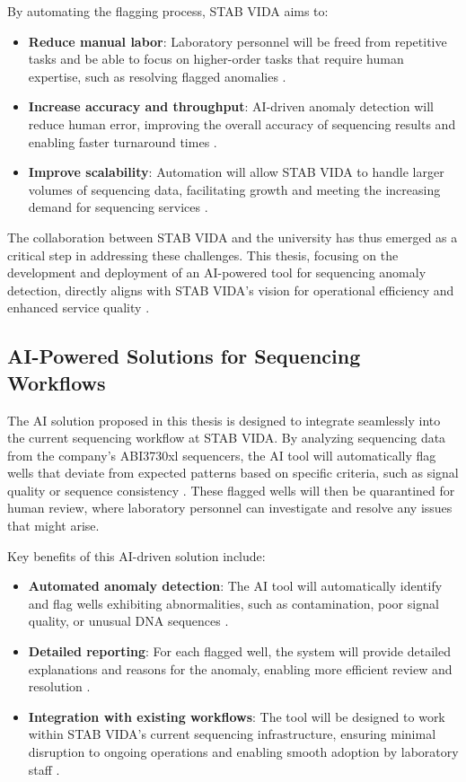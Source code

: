 By automating the flagging process, STAB VIDA aims to:

\begin{itemize} \item \textbf{Reduce manual labor}: Laboratory personnel will be freed from repetitive tasks and be able to focus on higher-order tasks that require human expertise, such as resolving flagged anomalies \cite{Yang2020}. \item \textbf{Increase accuracy and throughput}: AI-driven anomaly detection will reduce human error, improving the overall accuracy of sequencing results and enabling faster turnaround times \cite{Chen2019}. \item \textbf{Improve scalability}: Automation will allow STAB VIDA to handle larger volumes of sequencing data, facilitating growth and meeting the increasing demand for sequencing services \cite{Rajendran2021}. \end{itemize}

The collaboration between STAB VIDA and the university has thus emerged as a critical step in addressing these challenges. This thesis, focusing on the development and deployment of an AI-powered tool for sequencing anomaly detection, directly aligns with STAB VIDA’s vision for operational efficiency and enhanced service quality \cite{Sheng2018}.

\subsection{AI-Powered Solutions for Sequencing Workflows}

The AI solution proposed in this thesis is designed to integrate seamlessly into the current sequencing workflow at STAB VIDA. By analyzing sequencing data from the company's ABI3730xl sequencers, the AI tool will automatically flag wells that deviate from expected patterns based on specific criteria, such as signal quality or sequence consistency \cite{Gokcay2019}. These flagged wells will then be quarantined for human review, where laboratory personnel can investigate and resolve any issues that might arise.

Key benefits of this AI-driven solution include:

\begin{itemize} \item \textbf{Automated anomaly detection}: The AI tool will automatically identify and flag wells exhibiting abnormalities, such as contamination, poor signal quality, or unusual DNA sequences \cite{Wu2020}. \item \textbf{Detailed reporting}: For each flagged well, the system will provide detailed explanations and reasons for the anomaly, enabling more efficient review and resolution \cite{Zhang2021}. \item \textbf{Integration with existing workflows}: The tool will be designed to work within STAB VIDA’s current sequencing infrastructure, ensuring minimal disruption to ongoing operations and enabling smooth adoption by laboratory staff \cite{Chen2021}. \end{itemize}

